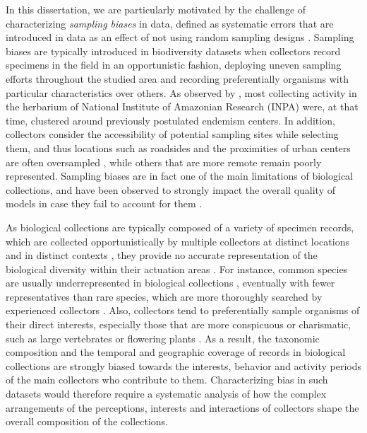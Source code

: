 In this dissertation, we are particularly motivated by the challenge of characterizing \textit{sampling biases} in data, defined as systematic errors that are introduced in data as an effect of not using random sampling designs \cite{Daru2017,Chrisman1991}.
Sampling biases are typically introduced in biodiversity datasets when collectors record specimens in the field in an opportunistic fashion, deploying uneven sampling efforts throughout the studied area and recording preferentially organisms with particular characteristics over others.
As observed by , most collecting activity in the herbarium of National Institute of Amazonian Research (INPA) were, at that time, clustered around previously postulated endemism centers.
In addition, collectors consider the accessibility of potential sampling sites while selecting them, and thus locations such as roadsides and the proximities of urban centers are often oversampled \cite{Daru2017}, while others that are more remote remain poorly represented.
%
Sampling biases are in fact one of the main limitations of biological collections, and have been observed to strongly impact the overall quality of models in case they fail to account for them \cite{Newbold2010,Araujo2006,Kramer-Schadt2013}.

As biological collections are typically composed of a variety of specimen records, which are collected opportunistically by multiple collectors at distinct locations and in distinct contexts \cite{Daru2017}, they provide no accurate representation of the biological diversity within their actuation areas \cite{Funk1999}.
For instance, common species are usually underrepresented in biological collections \cite{Nelson1990}, eventually with fewer representatives than rare species, which are more thoroughly searched by experienced collectors \cite{TerSteege2011}.
Also, collectors tend to preferentially sample organisms of their direct interests, especially those that are more conspicuous or charismatic, such as large vertebrates or flowering plants \cite{Newbold2010,Graham2004}.
As a result, the taxonomic composition and the temporal and geographic coverage of records in biological collections are strongly biased towards the interests, behavior and activity periods of the main collectors who contribute to them.
Characterizing bias in such datasets would therefore require a systematic analysis of how the complex arrangements of the perceptions, interests and interactions of collectors shape the overall composition of the collections.


